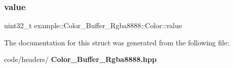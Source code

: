\mbox{\label{structexample_1_1_color___buffer___rgba8888_1_1_color_aa8c3f5e3038dd7743aab9592023418e4}} 
\subsubsection{value}
{\footnotesize\ttfamily uint32\+\_\+t example\+::\+Color\+\_\+\+Buffer\+\_\+\+Rgba8888\+::\+Color\+::value}



The documentation for this struct was generated from the following file\+:\begin{DoxyCompactItemize}
\item 
code/headers/\textbf{ Color\+\_\+\+Buffer\+\_\+\+Rgba8888.\+hpp}\end{DoxyCompactItemize}
